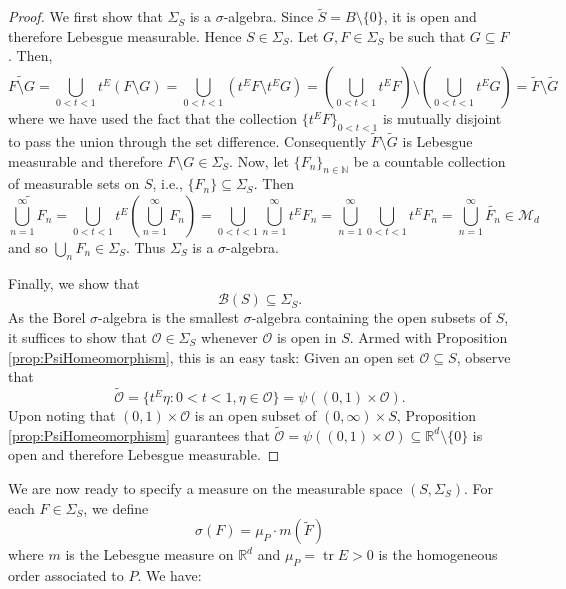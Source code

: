 \documentclass[11pt]{article}
\theoremstyle{theorem}
\newcommand\tr{\operatorname{tr}}
\begin{document}
\begin{proof}
We first show that $\Sigma_S$ is a $\sigma$-algebra. Since $\widetilde S=B\setminus\{0\}$, it is open and therefore Lebesgue measurable. Hence $S\in \Sigma_S$. Let $G, F\in \Sigma_S$ be such that $G\subseteq F$. Then,
\begin{equation*}
\widetilde{F\setminus G}=\bigcup_{0<t<1}t^E\left(F\setminus G\right)=\bigcup_{0<t<1}\left(t^EF\setminus t^E G\right)=\left(\bigcup_{0<t<1}t^E F\right)\setminus\left(\bigcup_{0<t<1}t^E G\right)=\widetilde F\setminus \widetilde G
\end{equation*}
where we have used the fact that the collection $\{t^E F\}_{0<t<1}$ is mutually disjoint to pass the union through the set difference. Consequently $\widetilde F\setminus \tilde{G}$ is Lebesgue measurable and therefore $F\setminus G\in \Sigma_S$.  Now, let $\{F_n\}_{n\in\mathbb{N}}$ be a countable collection of measurable sets on $S$, i.e., $\{F_n\}\subseteq \Sigma_S$. Then
\begin{equation*}
    \widetilde{\bigcup_{n=1}^\infty F_n}= \bigcup_{0<t<1} t^E \left(\bigcup_{n=1}^\infty F_n\right)= \bigcup_{0 <t < 1}  \bigcup_{n=1}^\infty  t^E F_n =\bigcup_{n=1}^\infty \bigcup_{0 <t < 1}  t^E F_n =\bigcup_{n=1}^\infty \widetilde{F_n} \in \mathcal{M}_d
\end{equation*}
and so $\bigcup_n F_n\in \Sigma_S$. Thus $\Sigma_S$ is a $\sigma$-algebra. 

Finally, we show that
\begin{equation*}
\mathcal{B}(S)\subseteq\Sigma_S.
\end{equation*}
As the Borel $\sigma$-algebra is the smallest $\sigma$-algebra containing the open subsets of $S$, it suffices to show that $\mathcal{O}\in \Sigma_S$ whenever $\mathcal{O}$ is open in $S$. Armed with Proposition \ref{prop:PsiHomeomorphism}, this is an easy task: Given an open set $\mathcal{O}\subseteq S$, observe that
\begin{equation*}
\widetilde{\mathcal{O}}=\{t^E\eta:0<t<1,\eta\in\mathcal{O}\}=\psi((0,1)\times\mathcal{O}).
\end{equation*}
Upon noting that $(0,1)\times\mathcal{O}$ is an open subset of $(0,\infty)\times S$, Proposition \ref{prop:PsiHomeomorphism} guarantees that $\widetilde{\mathcal{O}}=\psi((0,1)\times\mathcal{O})\subseteq\mathbb{R}^d\setminus\{0\}$ is open and therefore Lebesgue measurable. 
\end{proof}

\noindent We are now ready to specify a measure on the measurable space $(S,\Sigma_S)$. For each $F\in \Sigma_S$, we define
\begin{equation*}
\sigma(F)=\mu_P\cdot m(\widetilde F)
\end{equation*}
where $m$ is the Lebesgue measure on $\mathbb{R}^d$ and $\mu_P=\tr E>0$ is the homogeneous order associated to $P$. We have:
\end{document}

